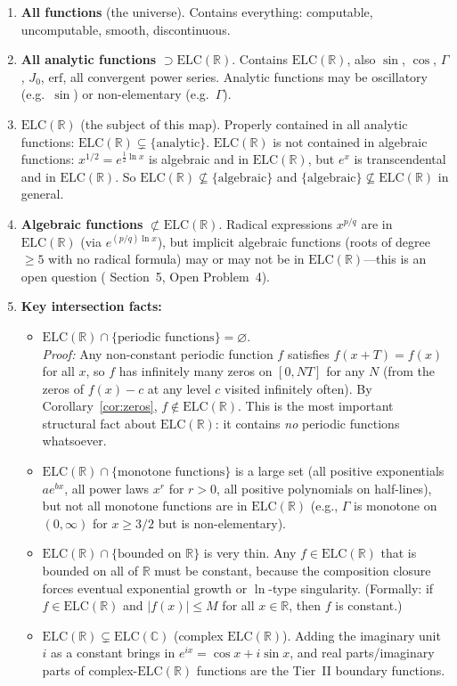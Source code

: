\documentclass[12pt,a4paper]{article}
\theoremstyle{definition}
\newcommand{\ELC}{\mathrm{ELC}(\mathbb{R})}
\newcommand{\ELCcx}{\mathrm{ELC}(\mathbb{C})}
\newcommand{\R}{\mathbb{R}}
\begin{document}
\begin{enumerate}[label=\textbf{Ring \arabic*:}, leftmargin=*, itemsep=10pt]

\item \textbf{All functions} (the universe).
  Contains everything: computable, uncomputable, smooth, discontinuous.

\item \textbf{All analytic functions} $\supset \ELC$.
  Contains $\ELC$, also $\sin$, $\cos$, $\Gamma$, $J_0$, $\mathrm{erf}$,
  all convergent power series.  Analytic functions may be
  oscillatory (e.g.\ $\sin$) or non-elementary (e.g.\ $\Gamma$).

\item \textbf{$\ELC$} (the subject of this map).
  Properly contained in all analytic functions: $\ELC\subsetneq\{\text{analytic}\}$.
  $\ELC$ is not contained in algebraic functions: $x^{1/2}=e^{\frac{1}{2}\ln x}$
  is algebraic and in $\ELC$, but $e^x$ is transcendental and in $\ELC$.
  So $\ELC \not\subseteq \{\text{algebraic}\}$ and
  $\{\text{algebraic}\} \not\subseteq \ELC$ in general.

\item \textbf{Algebraic functions} $\not\subset \ELC$.
  Radical expressions $x^{p/q}$ are in $\ELC$ (via $e^{(p/q)\ln x}$),
  but implicit algebraic functions (roots of degree $\ge 5$ with no
  radical formula) may or may not be in $\ELC$---this is an open question
  (\cite{F16} Section~5, Open Problem~4).

\item \textbf{Key intersection facts:}
\begin{itemize}
  \item $\ELC \cap \{\text{periodic functions}\} = \varnothing$.\\
    \emph{Proof:} Any non-constant periodic function $f$ satisfies
    $f(x+T)=f(x)$ for all $x$, so $f$ has infinitely many zeros on
    $[0,NT]$ for any $N$ (from the zeros of $f(x)-c$ at any level $c$
    visited infinitely often).  By Corollary~\ref{cor:zeros}, $f\notin\ELC$.
    This is the most important structural fact about $\ELC$: it contains
    \emph{no} periodic functions whatsoever.
  \item $\ELC \cap \{\text{monotone functions}\}$ is a large set
    (all positive exponentials $ae^{bx}$, all power laws $x^r$ for $r>0$,
    all positive polynomials on half-lines), but not all monotone functions
    are in $\ELC$ (e.g., $\Gamma$ is monotone on $(0,\infty)$ for $x\ge 3/2$
    but is non-elementary).
  \item $\ELC \cap \{\text{bounded on }\R\}$ is very thin.
    Any $f\in\ELC$ that is bounded on all of $\R$ must be constant,
    because the composition closure forces eventual exponential growth or
    $\ln$-type singularity.  (Formally: if $f\in\ELC$ and $|f(x)|\le M$
    for all $x\in\R$, then $f$ is constant.)
  \item $\ELC \subsetneq \ELCcx$ (complex $\ELC$).
    Adding the imaginary unit $i$ as a constant brings in
    $e^{ix}=\cos x+i\sin x$, and real parts/imaginary parts of
    complex-$\ELC$ functions are the Tier~II boundary functions.
\end{itemize}


\end{enumerate}
\end{document}
